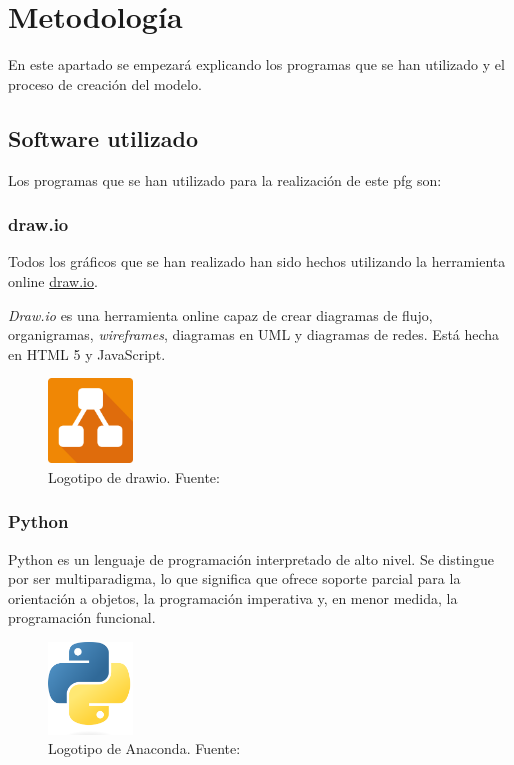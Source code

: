 \chapter{Metodología}
\label{ch:metodologia}

\quad En este apartado se empezará explicando los programas que se han utilizado y el proceso de creación del modelo.


\section{Software utilizado}

Los programas que se han utilizado para la realización de este \gls{pfg} son:

\subsection{draw.io}

Todos los gráficos que se han realizado han sido hechos utilizando la herramienta online \href{https://www.draw.io}{draw.io}. 

\textit{Draw.io} es una herramienta online capaz de crear diagramas de flujo, organigramas, \textit{wireframes}, diagramas en UML y diagramas de redes. Está hecha en HTML 5 y JavaScript\cite{drawio}.

\begin{figure}[H]
	\centering
	\includegraphics[width=0.2\textwidth]{figures/drawio.png}
	\caption{\label{fig:drawio}Logotipo de drawio. Fuente: \cite{drawio}}
\end{figure}

\subsection{Python}

Python es un lenguaje de programación interpretado de alto nivel. Se distingue por ser multiparadigma, lo que significa que ofrece soporte parcial para la orientación a objetos, la programación imperativa y, en menor medida, la programación funcional\cite{python}.

\begin{figure}[H]
	\centering
	\includegraphics[width=0.2\textwidth]{figures/pythonlogo.png}
	\caption{\label{fig:python}Logotipo de Anaconda. Fuente: \cite{python}}
\end{figure}

